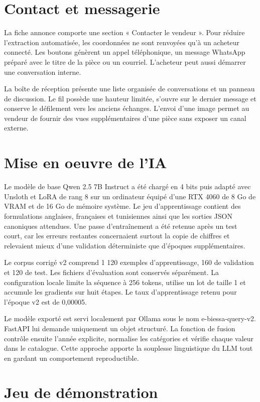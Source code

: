\section{Contact et messagerie}

La fiche annonce comporte une section « Contacter le vendeur ». Pour réduire l'extraction automatisée, les coordonnées ne sont renvoyées qu'à un acheteur connecté. Les boutons génèrent un appel téléphonique, un message WhatsApp préparé avec le titre de la pièce ou un courriel. L'acheteur peut aussi démarrer une conversation interne.


La boîte de réception présente une liste organisée de conversations et un panneau de discussion. Le fil possède une hauteur limitée, s'ouvre sur le dernier message et conserve le défilement vers les anciens échanges. L'envoi d'une image permet au vendeur de fournir des vues supplémentaires d'une pièce sans exposer un canal externe.


\section{Mise en oeuvre de l'IA}

Le modèle de base Qwen 2.5 7B Instruct a été chargé en 4 bits puis adapté avec Unsloth et LoRA de rang 8 sur un ordinateur équipé d'une RTX 4060 de 8 Go de VRAM et de 16 Go de mémoire système. Le jeu d'apprentissage contient des formulations anglaises, françaises et tunisiennes ainsi que les sorties JSON canoniques attendues. Une passe d'entraînement a été retenue après un test court, car les erreurs restantes concernaient surtout la copie de chiffres et relevaient mieux d'une validation déterministe que d'époques supplémentaires.


Le corpus corrigé v2 comprend 1 120 exemples d'apprentissage, 160 de validation et 120 de test. Les fichiers d'évaluation sont conservés séparément. La configuration locale limite la séquence à 256 tokens, utilise un lot de taille 1 et accumule les gradients sur huit étapes. Le taux d'apprentissage retenu pour l'époque v2 est de 0,00005.


Le modèle exporté est servi localement par Ollama sous le nom e-biessa-query-v2. FastAPI lui demande uniquement un objet structuré. La fonction de fusion contrôle ensuite l'année explicite, normalise les catégories et vérifie chaque valeur dans le catalogue. Cette approche apporte la souplesse linguistique du LLM tout en gardant un comportement reproductible.


\section{Jeu de démonstration}

